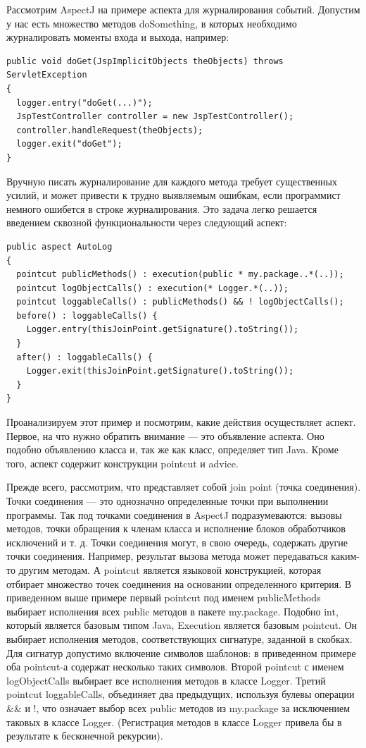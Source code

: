 \documentclass[a4paper,12pt,titlepage]{extarticle}
\begin{document}
Рассмотрим AspectJ на примере аспекта для журналирования событий. Допустим у
нас есть множество методов doSomething, в которых необходимо журналировать
моменты входа и выхода, например:
\begin{verbatim}
public void doGet(JspImplicitObjects theObjects) throws ServletException 
{
  logger.entry("doGet(...)");
  JspTestController controller = new JspTestController();
  controller.handleRequest(theObjects);
  logger.exit("doGet");
}
\end{verbatim}
Вручную писать журналирование для каждого метода требует существенных усилий, и
может привести к трудно выявляемым ошибкам, если программист немного ошибется
в строке журналирования. Это задача легко решается введением сквозной
функциональности через следующий аспект:
\begin{verbatim}
public aspect AutoLog 
{
  pointcut publicMethods() : execution(public * my.package..*(..));
  pointcut logObjectCalls() : execution(* Logger.*(..));
  pointcut loggableCalls() : publicMethods() && ! logObjectCalls();
  before() : loggableCalls() {
    Logger.entry(thisJoinPoint.getSignature().toString());
  }
  after() : loggableCalls() {
    Logger.exit(thisJoinPoint.getSignature().toString());
  }
}
\end{verbatim}
Проанализируем этот пример и посмотрим, какие действия осуществляет аспект.
Первое, на что нужно обратить внимание — это объявление аспекта. Оно подобно
объявлению класса и, так же как класс, определяет тип Java. Кроме того, аспект
содержит конструкции pointcut и advice.

Прежде всего, рассмотрим, что представляет собой join point (точка соединения).
Точки соединения --- это однозначно определенные точки при выполнении программы.
Так под точками соединения в AspectJ подразумеваются: вызовы методов, точки
обращения к членам класса и исполнение блоков обработчиков исключений и т. д.
Точки соединения могут, в свою очередь, содержать другие точки соединения.
Например, результат вызова метода может передаваться каким-то другим методам. А
pointcut является языковой конструкцией, которая отбирает множество точек
соединения на основании определенного критерия. В приведенном выше примере
первый pointcut под именем publicMethods выбирает исполнения всех public
методов в пакете my.package. Подобно int, который является базовым типом
Java, Execution является базовым pointcut. Он выбирает исполнения методов,
соответствующих сигнатуре, заданной в скобках. Для сигнатур допустимо включение
символов шаблонов: в приведенном примере оба pointcut-а содержат несколько
таких символов. Второй pointcut с именем logObjectCalls выбирает все исполнения
методов в классе Logger. Третий pointcut loggableCalls, объединяет два
предыдущих, используя булевы операции \&\& и !, что означает выбор всех public
методов из my.package за исключением таковых в классе Logger. (Регистрация
методов в классе Logger привела бы в результате к бесконечной рекурсии).
\end{document}
